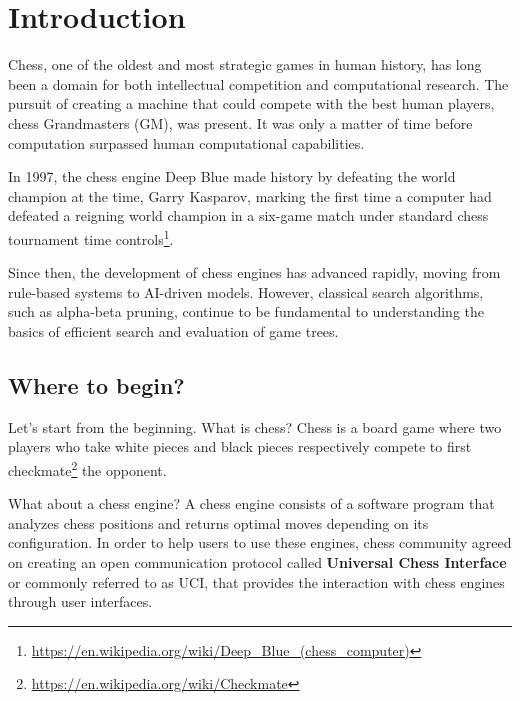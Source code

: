 \chapter{Introduction}
\label{cap:introduction}
\renewcommand{\figurename}{Figure}


Chess, one of the oldest and most strategic games in human history, has long been a domain for both intellectual competition and computational research. The pursuit of creating a machine that could compete with the best human players, chess Grandmasters (GM), was present. It was only a matter of time before computation surpassed human computational capabilities.

\vspace{1em}

\noindent In 1997, the chess engine Deep Blue made history by defeating the world champion at the time, Garry Kasparov, marking the first time a computer had defeated a reigning world champion in a six-game match under standard chess tournament time controls\footnote{\url{https://en.wikipedia.org/wiki/Deep_Blue_(chess_computer)}}.

\vspace{1em}

\noindent Since then, the development of chess engines has advanced rapidly, moving from rule-based systems to AI-driven models. However, classical search algorithms, such as alpha-beta pruning, continue to be fundamental to understanding the basics of efficient search and evaluation of game trees.


\section{Where to begin?}

Let's start from the beginning. What is chess? Chess is a board game where two players who take white pieces and black pieces respectively compete to first checkmate\footnote{\url{https://en.wikipedia.org/wiki/Checkmate}} the opponent.

\vspace{1em}

\noindent What about a chess engine? A chess engine consists of a software program that analyzes chess positions and returns optimal moves depending on its configuration. In order to help users to use these engines, chess community agreed on creating an open communication protocol called \textbf{Universal Chess Interface} or commonly referred to as UCI, that provides the interaction with chess engines through user interfaces.

